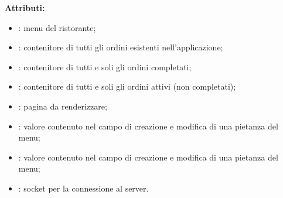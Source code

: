 \textbf{Attributi:}
\begin{itemize}
	\item {}: menu del ristorante;
	\item {}: contenitore di tutti gli ordini esistenti nell'applicazione;
	\item {}: contenitore di tutti e soli gli ordini completati;
	\item {}: contenitore di tutti e soli gli ordini attivi (non completati);
	\item {}: pagina da renderizzare;
	\item {}: valore contenuto nel campo  di creazione e modifica di una pietanza del menu;
	\item {}: valore contenuto nel campo  di creazione e modifica di una pietanza del menu;
	\item {}: socket per la connessione al server.
\end{itemize}

